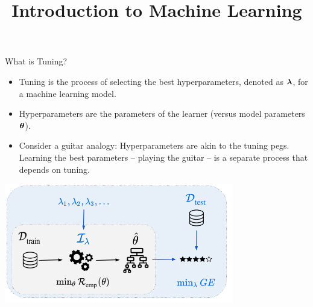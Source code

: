 \documentclass[11pt,compress,t,notes=noshow, xcolor=table]{beamer}
\title{Introduction to Machine Learning}
\date{}
\begin{document}
\sloppy



\begin{vbframe}{What is Tuning?}
\begin{itemize}
\item \small Tuning is the process of selecting the best hyperparameters, denoted as $\bm{\lambda}$, for a machine learning model.
\item \small Hyperparameters are the parameters of the learner (versus model parameters $\bm{\theta}$).
\item \small Consider a guitar analogy: Hyperparameters are akin to the tuning pegs. Learning the best parameters \bm{$\thetabh$} -- playing the guitar -- is a separate process that depends on tuning.
\end{itemize}

\begin{center}
\includegraphics[width = 0.75\textwidth]{figure_man/riskmin_bilevel3.png}
\end{center}

\end{vbframe}
\end{document}
